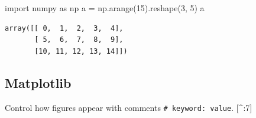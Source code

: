 \documentclass[
  letterpaper,
  DIV=11,
  numbers=noendperiod,
  oneside]{scrartcl}
\newenvironment{Shaded}{\begin{snugshade}}{\end{snugshade}}
\newcommand{\DecValTok}[1]{\textcolor[rgb]{0.68,0.00,0.00}{#1}}
\newcommand{\ImportTok}[1]{\textcolor[rgb]{0.00,0.46,0.62}{#1}}
\newcommand{\NormalTok}[1]{\textcolor[rgb]{0.00,0.23,0.31}{#1}}
\newcommand{\OperatorTok}[1]{\textcolor[rgb]{0.37,0.37,0.37}{#1}}
\begin{document}
\begin{Shaded}
\begin{Highlighting}[]
\ImportTok{import}\NormalTok{ numpy }\ImportTok{as}\NormalTok{ np}
\NormalTok{a }\OperatorTok{=}\NormalTok{ np.arange(}\DecValTok{15}\NormalTok{).reshape(}\DecValTok{3}\NormalTok{, }\DecValTok{5}\NormalTok{)}
\NormalTok{a}
\end{Highlighting}
\end{Shaded}

\begin{verbatim}
array([[ 0,  1,  2,  3,  4],
       [ 5,  6,  7,  8,  9],
       [10, 11, 12, 13, 14]])
\end{verbatim}

\hypertarget{matplotlib}{%
\subsection{Matplotlib}\label{matplotlib}}

Control how figures appear with comments
\texttt{\#\textbar{}\ keyword:\ value}. {[}\^{}:7{]}
\end{document}
